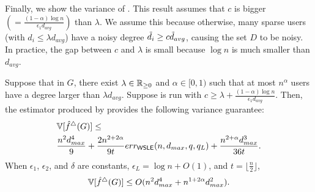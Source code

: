Finally, we show the variance of \AlgWSTriVR{}. 
This result assumes that $c$ is bigger $(= \frac{(1-\alpha) \log n}{\epsilon_1 d_{avg}})$ than $\lambda$. 
We assume this 
because otherwise, many sparse users (with $d_i \leq \lambda d_{avg}$) have a noisy degree $\tilde{d}_i \geq c \tilde{d}_{avg}$, causing the set $D$ to
be noisy. In practice, the gap between $c$ and $\lambda$ is small because 
$\log n$ is much smaller than $d_{avg}$. 


\begin{theorem}
\label{thm:var_II_ast}
  Suppose that in $G$, there exist $\lambda \in \mathbb{R}_{\ge0}$ and $\alpha \in [0,1)$
  such that at most $n^\alpha$ users have a degree larger than
  $\lambda d_{avg}$. Suppose \AlgWSTriVR{} is
  run with $c \geq \lambda + \frac{(1-\alpha) \log n}{\epsilon_1 d_{avg}}$.
  Then, the estimator produced by
  \AlgWSTriVR{} provides the following variance guarantee:
\begin{align}
  &\mathbb{V}[\hat{f}^\triangle(G)] \leq \nonumber\\
  &\frac{n^2 d_{max}^4}{9} + \frac{2n^{2+2\alpha}}{9t}err_{\textsf{WSLE}}(n,d_{max},q,q_L) + \frac{n^{2+\alpha}
  d_{max}^3 }{36t}.
  \label{eq:thm:l2_II_ast}
\end{align}
When $\epsilon_1$, $\epsilon_2$, and $\delta$ are constants,
$\epsilon_L = \log n + O(1)$, and $t = \lfloor\frac{n}{2}\rfloor$,
\begin{align}
  \mathbb{V}[\hat{f}^\triangle(G)] \leq O(n^2 d_{max}^4 + n^{1+2\alpha} d_{max}^2).
  \label{eq:thm:l2_II_ast_simp}
\end{align}
\end{theorem}

